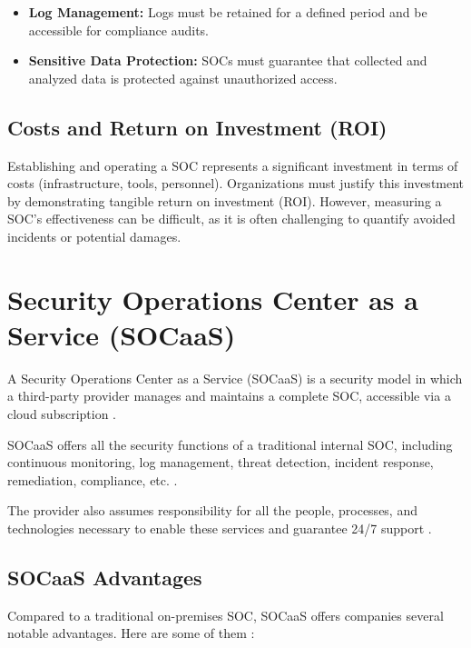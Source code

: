 \begin{itemize}
    \item \textbf{Log Management:} Logs must be retained for a defined period and be accessible for compliance audits.
    \item \textbf{Sensitive Data Protection:} SOCs must guarantee that collected and analyzed data is protected against unauthorized access.
\end{itemize}

\subsection{Costs and Return on Investment (ROI)}
\label{subsec:costs}

Establishing and operating a SOC represents a significant investment in terms of costs (infrastructure, tools, personnel). Organizations must justify this investment by demonstrating tangible return on investment (ROI). However, measuring a SOC's effectiveness can be difficult, as it is often challenging to quantify avoided incidents or potential damages.

\section{Security Operations Center as a Service (SOCaaS)}
\label{sec:socaas}

A Security Operations Center as a Service (SOCaaS) is a security model in which a third-party provider manages and maintains a complete SOC, accessible via a cloud subscription \cite{ref40} \cite{ref41}.

SOCaaS offers all the security functions of a traditional internal SOC, including continuous monitoring, log management, threat detection, incident response, remediation, compliance, etc. \cite{ref40} \cite{ref41}.

The provider also assumes responsibility for all the people, processes, and technologies necessary to enable these services and guarantee 24/7 support \cite{ref40} \cite{ref41}.

\subsection{SOCaaS Advantages}
\label{subsec:socaas-advantages}

Compared to a traditional on-premises SOC, SOCaaS offers companies several notable advantages. Here are some of them \cite{ref41}:

